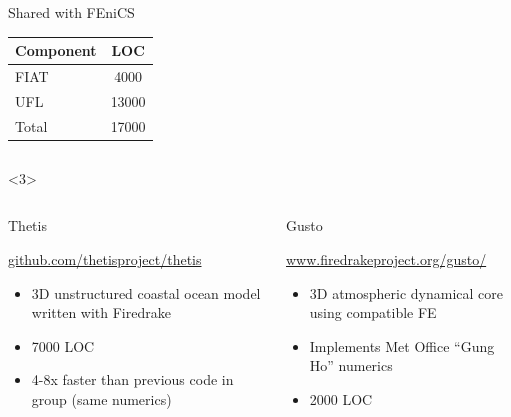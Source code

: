 \documentclass[presentation]{beamer}
\begin{document}
\begin{frame}
\begin{overlayarea}{\textwidth}{0.8\textheight}
\begin{onlyenv}
\begin{columns}
        \begin{column}[t]{0.5\textwidth}
          \begin{block}{Shared with FEniCS}
            \begin{table}
              \centering
              \begin{tabular}{lc}
                Component & LOC   \\
                \hline
                FIAT      & 4000  \\
                UFL       & 13000 \\
                \hline
                Total     & 17000
              \end{tabular}
            \end{table}        
          \end{block}
        \end{column}
      \end{columns}
    \end{onlyenv}
    \begin{onlyenv}<3>
      \begin{columns}
        \begin{column}[t]{0.5\textwidth}
          \begin{block}{Thetis}
            {\small
              {\scriptsize\url{github.com/thetisproject/thetis}}
              \begin{itemize}
              \item 3D unstructured coastal ocean model written with
                Firedrake
              \item 7000 LOC
              \item 4-8x faster than previous code in group (same numerics)
              \end{itemize}
            }
          \end{block}
        \end{column}
        \begin{column}[t]{0.5\textwidth}
          \begin{block}{Gusto}
            {\small
              {\scriptsize\url{www.firedrakeproject.org/gusto/}}
              \begin{itemize}
              \item 3D atmospheric dynamical core using compatible FE
              \item Implements Met Office ``Gung Ho'' numerics
              \item 2000 LOC
              \end{itemize}
            }
          \end{block}
        \end{column}
      \end{columns}
    \end{onlyenv}
  \end{overlayarea}
\end{frame}
\end{document}
